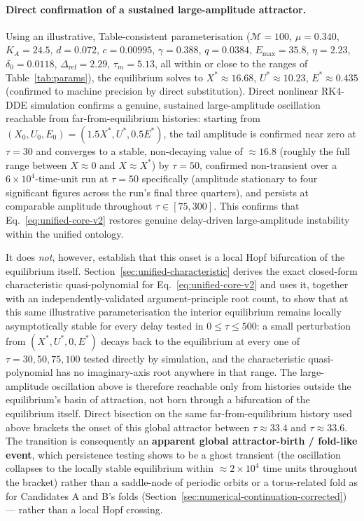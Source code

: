 \documentclass[twocolumn,10pt]{article}
\begin{document}
\paragraph{Direct confirmation of a sustained large-amplitude attractor.} Using an illustrative, Table-consistent parameterisation ($\mathcal M=100$, $\mu=0.340$, $K_A=24.5$, $d=0.072$, $c=0.00995$, $\gamma=0.388$, $q=0.0384$, $E_{\max}=35.8$, $\eta=2.23$, $\delta_0=0.0118$, $\Delta_{\text{ref}}=2.29$, $\tau_m=5.13$, all within or close to the ranges of Table~\ref{tab:params}), the equilibrium solves to $X^*\approx16.68$, $U^*\approx10.23$, $E^*\approx0.435$ (confirmed to machine precision by direct substitution). Direct nonlinear RK4-DDE simulation confirms a genuine, sustained large-amplitude oscillation reachable from far-from-equilibrium histories: starting from $(X_0,U_0,E_0)=(1.5X^*,U^*,0.5E^*)$, the tail amplitude is confirmed near zero at $\tau=30$ and converges to a stable, non-decaying value of $\approx16.8$ (roughly the full range between $X\approx0$ and $X\approx X^*$) by $\tau=50$, confirmed non-transient over a $6\times10^4$-time-unit run at $\tau=50$ specifically (amplitude stationary to four significant figures across the run's final three quarters), and persists at comparable amplitude throughout $\tau\in[75,300]$. This confirms that Eq.~\eqref{eq:unified-core-v2} restores genuine delay-driven large-amplitude instability within the unified ontology.

It does \emph{not}, however, establish that this onset is a local Hopf bifurcation of the equilibrium itself. Section~\ref{sec:unified-characteristic} derives the exact closed-form characteristic quasi-polynomial for Eq.~\eqref{eq:unified-core-v2} and uses it, together with an independently-validated argument-principle root count, to show that at this same illustrative parameterisation the interior equilibrium remains locally asymptotically stable for every delay tested in $0\le\tau\le500$: a small perturbation from $(X^*,U^*,0,E^*)$ decays back to the equilibrium at every one of $\tau=30,50,75,100$ tested directly by simulation, and the characteristic quasi-polynomial has no imaginary-axis root anywhere in that range. The large-amplitude oscillation above is therefore reachable only from histories outside the equilibrium's basin of attraction, not born through a bifurcation of the equilibrium itself. Direct bisection on the same far-from-equilibrium history used above brackets the onset of this global attractor between $\tau\approx33.4$ and $\tau\approx33.6$. The transition is consequently an \textbf{apparent global attractor-birth / fold-like event}, which persistence testing shows to be a ghost transient (the oscillation collapses to the locally stable equilibrium within $\approx2\times10^4$ time units throughout the bracket) rather than a saddle-node of periodic orbits or a torus-related fold as for Candidates A and B's folds (Section~\ref{sec:numerical-continuation-corrected}) --- rather than a local Hopf crossing.
\end{document}
